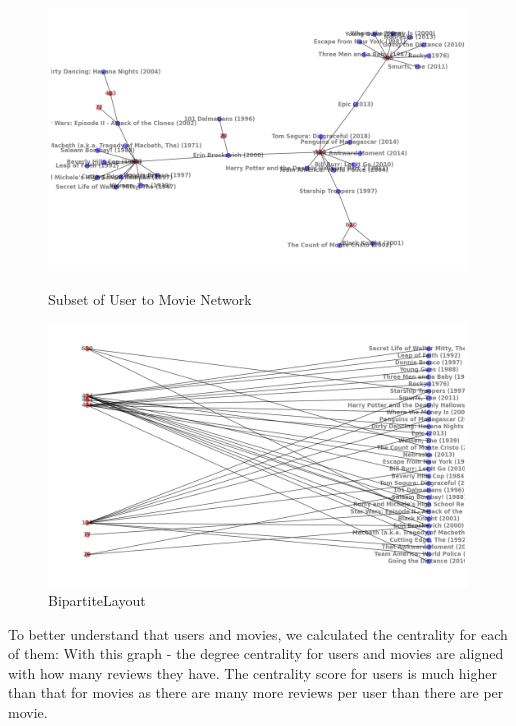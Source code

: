 \documentclass[12pt]{article}
\numberwithin{equation}{section}
\begin{document}
\begin{figure}[h!]
\centering
    \begin{minipage}[b]{0.49\linewidth}
         \centering
  	\includegraphics[width=0.99\textwidth]{sample_graph.png}
  	\caption{Subset of User to Movie Network}
  	\label{fig:count_ranking 2} 
    \end{minipage}
    \hspace{0.01cm}
    \begin{minipage}[b]{0.49\linewidth}
        \centering
  	\includegraphics[width=0.99\textwidth]{bipartite.png}
  	\caption{BipartiteLayout}
  	\label{fig:ranking_ts 2}
    \end{minipage}
\end{figure}


To better understand that users and movies, we calculated the centrality for each of them:
With this graph - the degree centrality for users and movies are aligned with how many reviews they have. The centrality score for users is much higher than that for movies as there are many more reviews per user than there are per movie. 
\end{document}
